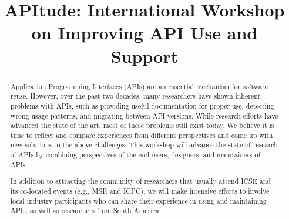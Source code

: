\documentclass[10pt, conference]{IEEEtran}
\begin{document}
\title{APItude: International Workshop on Improving API Use and Support}


\newcommand\tud[0]{\textsuperscript{\normalfont \textdagger}}
\newcommand\iowa[0]{\textsuperscript{\normalfont \textparagraph}}
\newcommand\utd[0]{\textsuperscript{\normalfont \ddag}}
\newcommand\lanu[0]{\textsuperscript{\normalfont \textsection}}
\newcommand\ualberta[0]{\textsuperscript{\normalfont \textasteriskcentered}}

\author{
\and
{}
\and
{}
\and
{}
}


\maketitle


\begin{abstract}
Application Programming Interfaces (APIs) are an essential mechanism for software reuse. However, over the past two decades, many researchers have shown inherent problems with APIs, such as providing useful documentation for proper use, detecting wrong usage patterns, and migrating between API versions. While research efforts have advanced the state of the art, most of these problems still exist today. We believe it is time to reflect and compare experiences from different perspectives and come up with new solutions to the above challenges. This workshop will advance the state of research of APIs by combining perspectives of the end users, designers, and maintainers of APIs.

In addition to attracting the community of researchers that usually attend ICSE and its co-located events (e.g., MSR and ICPC), we will make intensive efforts to involve local industry participants who can share their experience in using and maintaining APIs, as well as researchers from South America.
\end{abstract}
\end{document}
